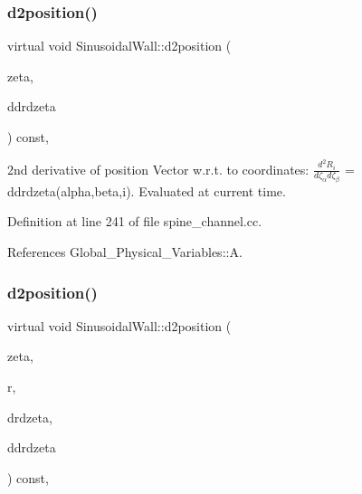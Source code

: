 \subsubsection{\texorpdfstring{d2position()}{d2position()}\hspace{0.1cm}{\footnotesize\ttfamily [1/2]}}
{\footnotesize\ttfamily virtual void Sinusoidal\+Wall\+::d2position (\begin{DoxyParamCaption}\item[{const Vector$<$ double $>$ \&}]{zeta,  }\item[{Rank\+Three\+Tensor$<$ double $>$ \&}]{ddrdzeta }\end{DoxyParamCaption}) const\hspace{0.3cm}{\ttfamily [inline]}, {\ttfamily [virtual]}}



2nd derivative of position Vector w.\+r.\+t. to coordinates\+: $ \frac{d^2R_i}{d \zeta_\alpha d \zeta_\beta}$ = ddrdzeta(alpha,beta,i). Evaluated at current time. 



Definition at line 241 of file spine\+\_\+channel.\+cc.



References Global\+\_\+\+Physical\+\_\+\+Variables\+::A.

\mbox{\label{classSinusoidalWall_aa0910636dfb4aa6d14e1a6bd012da573}} 
\subsubsection{\texorpdfstring{d2position()}{d2position()}\hspace{0.1cm}{\footnotesize\ttfamily [2/2]}}
{\footnotesize\ttfamily virtual void Sinusoidal\+Wall\+::d2position (\begin{DoxyParamCaption}\item[{const Vector$<$ double $>$ \&}]{zeta,  }\item[{Vector$<$ double $>$ \&}]{r,  }\item[{Dense\+Matrix$<$ double $>$ \&}]{drdzeta,  }\item[{Rank\+Three\+Tensor$<$ double $>$ \&}]{ddrdzeta }\end{DoxyParamCaption}) const\hspace{0.3cm}{\ttfamily [inline]}, {\ttfamily [virtual]}}



